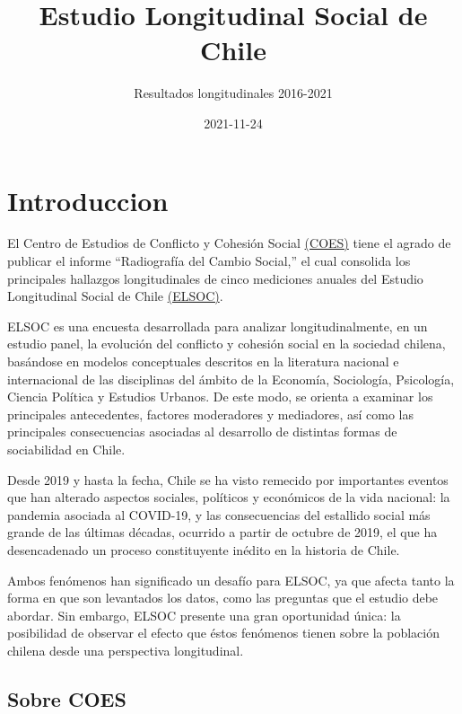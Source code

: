 \documentclass[
  12pt,
]{book}
\title{Estudio Longitudinal Social de Chile}
\subtitle{Resultados longitudinales 2016-2021}
\author{}
\date{\vspace{-2.5em}2021-11-24}
\begin{document}
\maketitle

{
\hypersetup{linkcolor=}
\setcounter{tocdepth}{1}
\tableofcontents
}
\listoftables
\listoffigures
{}
\hypertarget{introduccion}{%
\chapter{Introduccion}\label{introduccion}}

El Centro de Estudios de Conflicto y Cohesión Social \href{https://coes.cl/}{(COES)} tiene el agrado de publicar el informe ``Radiografía del Cambio Social,'' el cual consolida los principales hallazgos longitudinales de cinco mediciones anuales del Estudio Longitudinal Social de Chile \href{https://coes.cl/encuesta-panel/}{(ELSOC)}.

ELSOC es una encuesta desarrollada para analizar longitudinalmente, en un estudio panel, la evolución del conflicto y cohesión social en la sociedad chilena, basándose en modelos conceptuales descritos en la literatura nacional e internacional de las disciplinas del ámbito de la Economía, Sociología, Psicología, Ciencia Política y Estudios Urbanos. De este modo, se orienta a examinar los principales antecedentes, factores moderadores y mediadores, así como las principales consecuencias asociadas al desarrollo de distintas formas de sociabilidad en Chile.

Desde 2019 y hasta la fecha, Chile se ha visto remecido por importantes eventos que han alterado aspectos sociales, políticos y económicos de la vida nacional: la pandemia asociada al COVID-19, y las consecuencias del estallido social más grande de las últimas décadas, ocurrido a partir de octubre de 2019, el que ha desencadenado un proceso constituyente inédito en la historia de Chile.

Ambos fenómenos han significado un desafío para ELSOC, ya que afecta tanto la forma en que son levantados los datos, como las preguntas que el estudio debe abordar. Sin embargo, ELSOC presente una gran oportunidad única: la posibilidad de observar el efecto que éstos fenómenos tienen sobre la población chilena desde una perspectiva longitudinal.

\hypertarget{sobre-coes}{%
\section{Sobre COES}\label{sobre-coes}}
\end{document}

